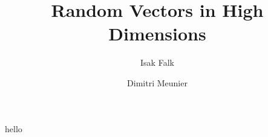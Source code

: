 \documentclass{beamer}
\title[]{Random Vectors in High Dimensions}
\author[]{Isak Falk \and Dimitri Meunier}
\begin{document}
\begin{frame}
  \titlepage%
\end{frame}

\begin{frame}
  \begin{section}
    hello
  \end{section}
\end{frame}
\end{document}
